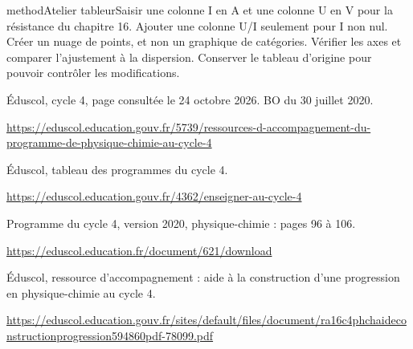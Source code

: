 \begin{pcEncadre}{method}{Atelier tableur}Saisir une colonne I en A et une colonne U en V pour la résistance du chapitre 16. Ajouter une colonne U/I seulement pour I non nul. Créer un nuage de points, et non un graphique de catégories. Vérifier les axes et comparer l’ajustement à la dispersion. Conserver le tableau d’origine pour pouvoir contrôler les modifications.\end{pcEncadre}
\label{references}
\par\noindent\begin{minipage}{\linewidth}
Éduscol, cycle 4, page consultée le 24 octobre 2026. BO du 30 juillet 2020.\par{\fontsize{8.5}{11}\selectfont\raggedright\url{https://eduscol.education.gouv.fr/5739/ressources-d-accompagnement-du-programme-de-physique-chimie-au-cycle-4}\par}\end{minipage}\par
\par\noindent\begin{minipage}{\linewidth}
Éduscol, tableau des programmes du cycle 4.\par{\fontsize{8.5}{11}\selectfont\raggedright\url{https://eduscol.education.gouv.fr/4362/enseigner-au-cycle-4}\par}\end{minipage}\par
\par\noindent\begin{minipage}{\linewidth}
Programme du cycle 4, version 2020, physique-chimie : pages 96 à 106.\par{\fontsize{8.5}{11}\selectfont\raggedright\url{https://eduscol.education.fr/document/621/download}\par}\end{minipage}\par
\par\noindent\begin{minipage}{\linewidth}
Éduscol, ressource d’accompagnement : aide à la construction d’une progression en physique-chimie au cycle 4.\par{\fontsize{8.5}{11}\selectfont\raggedright\url{https://eduscol.education.gouv.fr/sites/default/files/document/ra16c4phchaideconstructionprogression594860pdf-78099.pdf}\par}\end{minipage}\par
